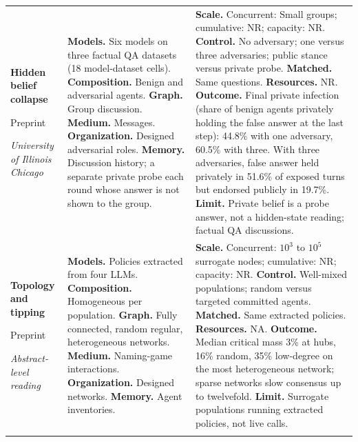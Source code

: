 \begin{longtable}{@{}>{\raggedright\arraybackslash}p{}>{\raggedright\arraybackslash}p{}>{\raggedright\arraybackslash}p{}@{}}
\textbf{Hidden belief collapse}\par \citep{believed-but-not-said}\par Preprint\par\emph{University of Illinois Chicago} & \textbf{Models.} Six models on three factual QA datasets (18 model-dataset cells). \textbf{Composition.} Benign and adversarial agents. \textbf{Graph.} Group discussion. \textbf{Medium.} Messages. \textbf{Organization.} Designed adversarial roles. \textbf{Memory.} Discussion history; a separate private probe each round whose answer is not shown to the group. & \textbf{Scale.} Concurrent: Small groups; cumulative: NR; capacity: NR. \textbf{Control.} No adversary; one versus three adversaries; public stance versus private probe. \textbf{Matched.} Same questions. \textbf{Resources.} NR. \textbf{Outcome.} Final private infection (share of benign agents privately holding the false answer at the last step): 44.8\% with one adversary, 60.5\% with three. With three adversaries, false answer held privately in 51.6\% of exposed turns but endorsed publicly in 19.7\%. \textbf{Limit.} Private belief is a probe answer, not a hidden-state reading; factual QA discussions. \\ \addlinespace[5pt]
\textbf{Topology and tipping}\par \citep{network-topology-consensus}\par Preprint\par\emph{Abstract-level reading} & \textbf{Models.} Policies extracted from four LLMs. \textbf{Composition.} Homogeneous per population. \textbf{Graph.} Fully connected, random regular, heterogeneous networks. \textbf{Medium.} Naming-game interactions. \textbf{Organization.} Designed networks. \textbf{Memory.} Agent inventories. & \textbf{Scale.} Concurrent: $10^{3}$ to $10^{5}$ surrogate nodes; cumulative: NR; capacity: NR. \textbf{Control.} Well-mixed populations; random versus targeted committed agents. \textbf{Matched.} Same extracted policies. \textbf{Resources.} NA. \textbf{Outcome.} Median critical mass 3\% at hubs, 16\% random, 35\% low-degree on the most heterogeneous network; sparse networks slow consensus up to twelvefold. \textbf{Limit.} Surrogate populations running extracted policies, not live calls. \\ \addlinespace[5pt]

\end{longtable}
